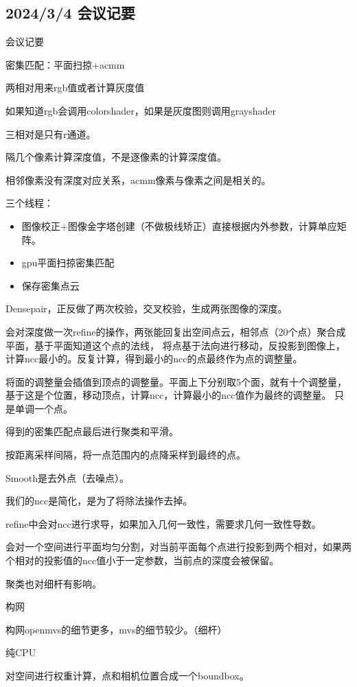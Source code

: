 \subsection{2024/3/4 会议记要}
会议记要

密集匹配：平面扫掠+acmm

两相对用来rgb值或者计算灰度值

如果知道rgb会调用colorshader，如果是灰度图则调用grayshader

三相对是只有r通道。

隔几个像素计算深度值，不是逐像素的计算深度值。

相邻像素没有深度对应关系，acmm像素与像素之间是相关的。

三个线程：

\begin{itemize}
	\item 图像校正+图像金字塔创建（不做极线矫正）直接根据内外参数，计算单应矩阵。
	\item gpu平面扫掠密集匹配
	\item 保存密集点云
\end{itemize}

Densepair，正反做了两次校验，交叉校验，生成两张图像的深度。

会对深度做一次refine的操作，两张能回复出空间点云，相邻点（20个点）聚合成平面，基于平面知道这个点的法线，
将点基于法向进行移动，反投影到图像上，计算ncc最小的。反复计算，得到最小的ncc的点最终作为点的调整量。

将面的调整量会插值到顶点的调整量。平面上下分别取5个面，就有十个调整量，基于这是个位置，移动顶点，计算ncc，计算最小的ncc值作为最终的调整量。
只是单调一个点。

得到的密集匹配点最后进行聚类和平滑。

按距离采样间隔，将一点范围内的点降采样到最终的点。

Smooth是去外点（去噪点）。

我们的ncc是简化，是为了将除法操作去掉。


refine中会对ncc进行求导，如果加入几何一致性，需要求几何一致性导数。

会对一个空间进行平面均匀分割，对当前平面每个点进行投影到两个相对，如果两个相对的投影值的ncc值小于一定参数，当前点的深度会被保留。

聚类也对细杆有影响。


构网

构网openmvs的细节更多，mvs的细节较少。（细杆）

纯CPU

对空间进行权重计算，点和相机位置合成一个boundbox。

